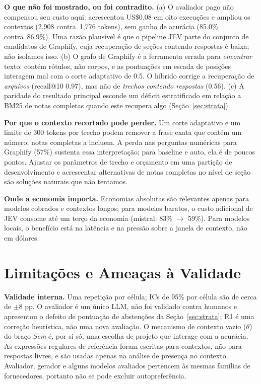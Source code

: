 \documentclass[conference,onecolumn,11pt]{IEEEtran}
\begin{document}
\textbf{O que não foi mostrado, ou foi contradito.} (a) O avaliador pago não compensou seu custo aqui: acrescentou US\$0.08 em oito execuções e ampliou os contextos (2,908 contra\ 1,776 tokens), sem ganho de acurácia (85.0\% contra\ 86.9\%). Uma razão plausível é que o pipeline JEV parte do conjunto de candidatos de Graphify, cuja recuperação de seções contendo respostas é baixa; não isolamos isso. (b) O grafo de Graphify é a ferramenta errada para \emph{encontrar} texto: contém rótulos, não corpos, e as pontuações em escada de posições interagem mal com o corte adaptativo de 0.5. O híbrido corrige a recuperação de \emph{arquivos} (recall@10 0.97), mas não de \emph{trechos contendo respostas} (0.56). (c) A paridade do resultado principal esconde um déficit estratificado em relação a BM25 de notas completas quando este recupera algo (Seção~\ref{sec:strata}).

\textbf{Por que o contexto recortado pode perder.} Um corte adaptativo e um limite de 300 tokens por trecho podem remover a frase exata que contém um número; notas completas a incluem. A perda nas perguntas numéricas para Graphify (57\%) sustenta essa interpretação; para baseline e auto, ela é de poucos pontos. Ajustar os parâmetros de trecho e orçamento em uma partição de desenvolvimento e acrescentar alternativas de notas completas no nível de seção são soluções naturais que não tentamos.

\textbf{Onde a economia importa.} Economias absolutas são relevantes apenas para modelos cobrados e contextos longos; para modelos baratos, o custo adicional de JEV consome até um terço da economia (mistral: 83\% $\to$ 59\%). Para modelos locais, o benefício está na latência e na pressão sobre a janela de contexto, não em dólares.

\section{Limitações e Ameaças à Validade}\label{sec:limits}
\textbf{Validade interna.} Uma repetição por célula; ICs de 95\% por célula são de cerca de $\pm8$ pp. O avaliador é um único LLM, não foi validado contra humanos e apresentou o defeito de pontuação de abstenções da Seção~\ref{sec:strata}; R1 é uma correção heurística, não uma nova avaliação. O mecanismo de contexto vazio ($\theta$) do braço \emph{Sem} é, por si só, uma escolha de projeto que interage com a acurácia. As expressões regulares de referência foram escritas para contextos, não para respostas livres, e são usadas apenas na análise de presença no contexto. Avaliador, gerador e alguns modelos avaliados pertencem às mesmas famílias de fornecedores, portanto não se pode excluir autopreferência.
\end{document}
